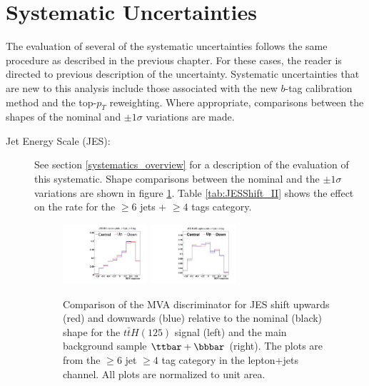 \section{Systematic Uncertainties}
\label{systematics_II_overview}

\par The evaluation of several of the systematic uncertainties follows
the same procedure as described in the previous chapter.  For these
cases, the reader is directed to previous description of the
uncertainty.  Systematic uncertainties that are new to this analysis
include those associated with the new $b$-tag calibration method and the
top-$p_{T}$ reweighting.  Where appropriate, comparisons between the
shapes of the nominal and $\pm1\sigma$ variations are made.  


\begin{description}

\item[Jet Energy Scale (JES):] See section \ref{systematics_overview}
  for a description of the evaluation of this systematic.  Shape
  comparisons between the nominal and the $\pm1\sigma$ variations are
  shown in figure \ref{fig:JESShift_II}.  Table \ref{tab:JESShift_II}
  shows the effect on the rate for the $\geq 6$ jets + $\geq 4$ tags
  category.  

\begin{figure}[hbtp]
 \begin{center}
   \includegraphics[width=0.31\textwidth]{Figures/Analysis_2_Diagrams/SystPlot_CMS_scale_j_ttH120_ljets_jge6_tge4}
   \includegraphics[width=0.31\textwidth]{Figures/Analysis_2_Diagrams/SystPlot_CMS_scale_j_ttbarPlusBBbar_ljets_jge6_tge4}
   \caption{ Comparison of the MVA discriminator for JES shift upwards
     (red) and downwards (blue) relative to the nominal (black) shape
     for the $t\bar{t}H(125)$ signal (left) and the main background sample
     $\ttbar+\bbbar$ (right).  The plots are from the $\geq 6$ jet $\geq 4$ tag category in the
     lepton+jets channel.  All plots are normalized to unit area.}
   \label{fig:JESShift_II}
 \end{center}
\end{figure}


\end{description}
